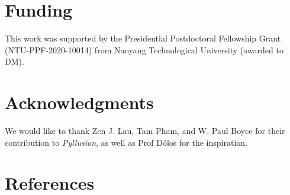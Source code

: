 \documentclass[
  man,floatsintext]{apa6}
\begin{document}
\hypertarget{funding}{%
\section{Funding}\label{funding}}

This work was supported by the Presidential Postdoctoral Fellowship Grant (NTU-PPF-2020-10014) from Nanyang Technological University (awarded to DM).

\hypertarget{acknowledgments}{%
\section{Acknowledgments}\label{acknowledgments}}

We would like to thank Zen J. Lau, Tam Pham, and W. Paul Boyce for their contribution to \emph{Pyllusion}, as well as Prof Dólos for the inspiration.

\newpage

\hypertarget{references}{%
\section{References}\label{references}}
\end{document}
